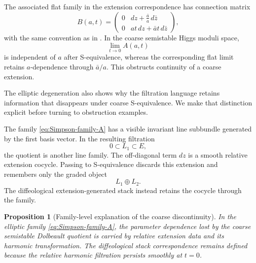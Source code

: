 \documentclass[11pt,reqno]{amsart}
\newtheorem{proposition}[theorem]{Proposition}
\theoremstyle{definition}
\theoremstyle{remark}
\begin{document}
The associated flat family in the extension correspondence has connection matrix
\begin{equation}\label{eq:Simpson-family-B}
  B(a,t)
  =
  \begin{pmatrix}
    0 & dz+\frac{\bar a}{a}\,d\bar z\\
    0 & at\,dz+\bar a t\,d\bar z
  \end{pmatrix},
\end{equation}
with the same convention as in \cite{AzamRayan2026,Simpson1994}.  In the coarse semistable Higgs moduli space,
\[
  \lim_{t\to0}A(a,t)
\]
is independent of $a$ after S-equivalence, whereas the corresponding flat limit retains $a$-dependence through $\bar a/a$.  This obstructs continuity of a coarse extension.


The elliptic degeneration also shows why the filtration language retains information that disappears under coarse S-equivalence.  We make that distinction explicit before turning to obstruction examples.


The family \eqref{eq:Simpson-family-A} has a visible invariant line subbundle generated by the first basis vector.  In the resulting filtration
\[
  0\subset L_1\subset E,
\]
the quotient is another line family.  The off-diagonal term $dz$ is a smooth relative extension cocycle.  Passing to S-equivalence discards this extension and remembers only the graded object
\[
  L_1\oplus L_2.
\]
The diffeological extension-generated stack instead retains the cocycle through the family.

\begin{proposition}[Family-level explanation of the coarse discontinuity]\label{prop:coarse-discontinuity-explanation}
In the elliptic family \eqref{eq:Simpson-family-A}, the parameter dependence lost by the coarse semistable Dolbeault quotient is carried by relative extension data and its harmonic transformation.  The diffeological stack correspondence remains defined because the relative harmonic filtration persists smoothly at $t=0$.
\end{proposition}
\end{document}
